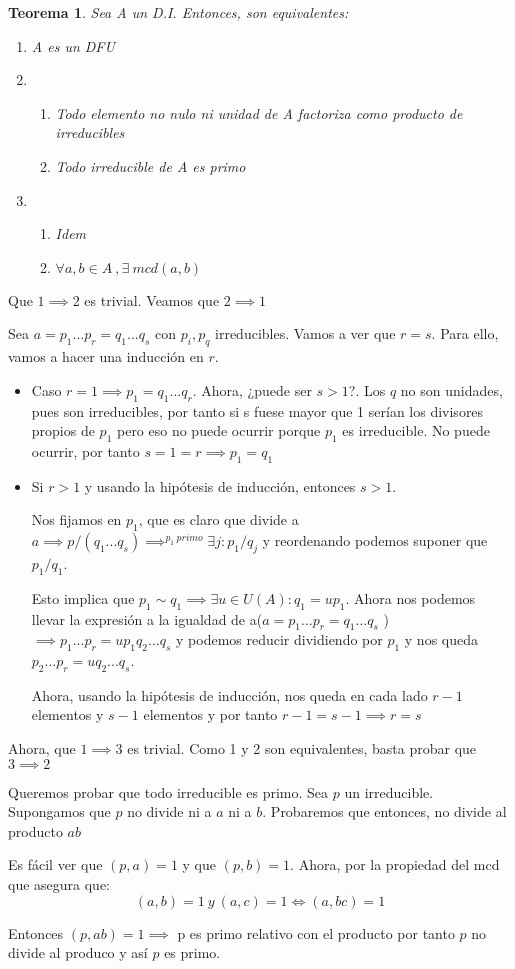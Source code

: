 \documentclass[11pt, a4paper, titlepage]{article}
\makeatletter
\renewenvironment{proof}[1][\proofname] {\vspace{-15pt}\par\pushQED{\qed}\normalfont\topsep6\p@\@plus6\p@\relax\trivlist\item[\hskip\labelsep\it#1\@addpunct{.}]\ignorespaces}{\popQED\endtrivlist\@endpefalse}
\theoremstyle{theorem-style}
\newtheorem*{nth}{Teorema}
\theoremstyle{definition-style}
\theoremstyle{remark-style}
\theoremstyle{example-style}
\newenvironment{nlist}
{\begin{enumerate}
\renewcommand\labelenumi{(\emph{\roman{enumi})}}}
{\end{enumerate}}
\makeatother
\begin{document}
\begin{nth}
	Sea A un D.I. Entonces, son equivalentes:
	\begin{nlist}
	\item A es un DFU
	\item \begin{enumerate}
	\item Todo elemento no nulo ni unidad de A factoriza como producto de irreducibles
	\item Todo irreducible de A es primo
\end{enumerate}
	\item \begin{enumerate}
	\item Idem
	\item $\forall a,b \in A \ , \exists \ mcd(a,b)$
\end{enumerate}
\end{nlist}
\end{nth}
\begin{proof}
	Que $1\implies 2$ es trivial. Veamos que $2 \implies 1$
	
	Sea $a= p_1...p_r = q_1...q_s$ con $p_i,p_q$ irreducibles. Vamos a ver que $r=s$. Para ello, vamos a hacer una inducción en $r$.
	
	\begin{itemize}
	\item Caso $r=1 \implies p_1 = q_1...q_r$. Ahora, ¿puede ser $s>1$?. Los $q$ no son unidades, pues son irreducibles, por tanto si s fuese mayor que 1 serían los divisores propios de $p_1$ pero eso no puede ocurrir porque $p_1$ es irreducible. No puede ocurrir, por tanto $s=1=r \implies p_1 = q_1$
	
	\item Si $r> 1$ y usando la hipótesis de inducción, entonces $s > 1$.
	
	Nos fijamos en $p_1$, que es claro que divide a $a\implies p/(q_1...q_s)\implies^{p_1 \ primo} \exists j : p_1 /q_j$ y reordenando podemos suponer que $p_1/q_1$.
	
	Esto implica que $p_1 \sim q_1 \implies \exists u \in U(A): q_1 = up_1$. Ahora nos podemos llevar la expresión a la igualdad de a($a= p_1...p_r = q_1...q_s$ ) $\implies p_1...p_r = up_1q_2...q_s $ y podemos reducir dividiendo por $p_1$ y nos queda $p_2...p_r = uq_2...q_s$. 
	
	Ahora, usando la hipótesis de inducción, nos queda en cada lado $r-1$ elementos y $s-1$ elementos y por tanto $r-1 =s-1\implies r=s$
\end{itemize}

Ahora, que $1 \implies 3$ es trivial. Como 1 y 2 son equivalentes, basta probar que $3 \implies 2$

Queremos probar que todo irreducible es primo. Sea $p$ un irreducible. Supongamos que $p$ no divide ni a $a$ ni a $b$. Probaremos que entonces, no divide al producto $ab$

Es fácil ver que $(p,a) = 1$ y que $(p,b) = 1$. Ahora, por la propiedad del mcd que asegura que:
\[
(a,b) = 1 \ y \ (a,c) = 1 \iff (a,bc) = 1
\]

Entonces $(p,ab) = 1 \implies$ p es primo relativo con el producto por tanto $p$ no divide al produco y así $p$ es primo.
\end{proof}
\end{document}

